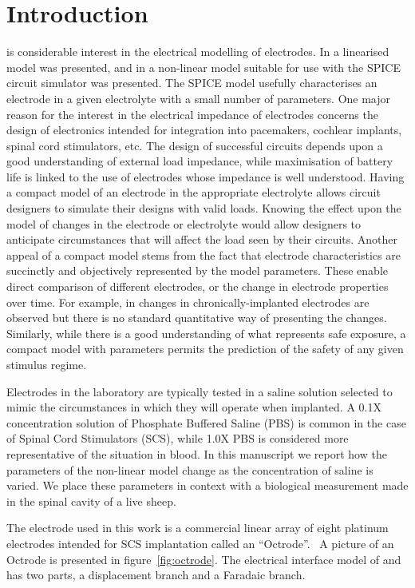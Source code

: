 \documentclass[journal, a4paper]{IEEEtran}
\begin{document}
\section{Introduction}
 is considerable interest in the electrical modelling of electrodes. \cite{Cogan2008,Troy2006}
In \cite{Franks2005} a linearised model was presented, and in \cite{ScottSingle2013} a non-linear model
suitable for use with the SPICE circuit simulator was presented. The SPICE model usefully characterises an electrode in a given electrolyte with a small number of parameters.
One major reason for the interest in the electrical impedance of electrodes concerns the design of electronics intended for integration into pacemakers, cochlear implants, spinal cord stimulators, etc. The design of successful circuits depends upon a good understanding of external load impedance, while maximisation of battery life is linked to the use of electrodes whose impedance is well understood.
Having a compact model of an electrode in the appropriate electrolyte allows circuit designers to simulate their designs with valid loads. Knowing the effect upon the model of changes in the electrode or electrolyte would allow designers to anticipate circumstances that will affect the load seen by their circuits. Another appeal of a compact model stems from the fact that electrode characteristics are succinctly and objectively represented by the model parameters. These enable direct comparison of different electrodes, or the change in electrode properties over time. For example, in \cite{Kane13} changes in chronically-implanted electrodes are observed but there is no standard quantitative way of presenting the changes. Similarly, while there is a good understanding of what represents safe exposure, a compact model with parameters permits the prediction of the safety of any given stimulus regime.~\cite{Merrill05}

Electrodes in the laboratory are typically tested in a saline solution selected to mimic the circumstances in which they will operate when implanted.
A 0.1X concentration solution of Phosphate Buffered Saline (PBS) is common in the case of Spinal Cord Stimulators (SCS), while 1.0X PBS is considered more representative of the situation in blood.
In this manuscript we report how the parameters of the non-linear model change as the concentration of saline is varied. We place these parameters in context with a biological measurement made in the spinal cavity of a live sheep.

The electrode used in this work is a commercial linear array of eight platinum electrodes intended for SCS implantation called an ``Octrode''.~\cite{StJudeOctrode} A picture of an Octrode is presented in figure~\ref{fig:octrode}.
The electrical interface model of \cite{Franks2005} and \cite{ScottSingle2013} has two parts, a displacement branch and a Faradaic branch.
\end{document}

